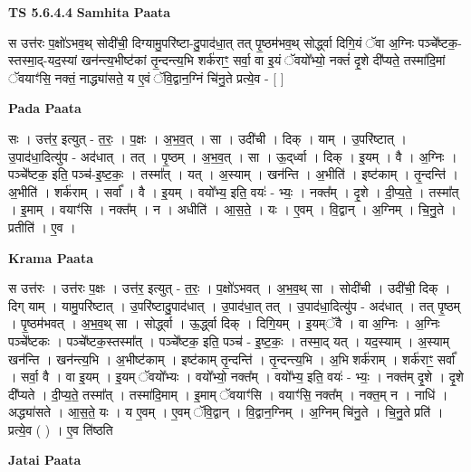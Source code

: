 \documentclass[17pt]{extarticle}
\begin{document}
\textbf{TS 5.6.4.4 } \newline
\textbf{Samhita Paata} \newline

स उत्त॑रः प॒क्षो॑ऽभव॒थ् सोदी॑ची॒ दिग्यामु॒परि॑ष्टा-दु॒पाद॑धा॒त् तत् पृ॒ष्ठम॑भव॒थ् सोर्द्ध्वा दिगि॒यं ॅवा अ॒ग्निः पञ्चे᳚ष्टक॒-स्तस्मा॒द्-यद॒स्यां खन॑न्त्य॒भीष्ट॑कां तृ॒न्दन्त्य॒भि शर्क॑राꣳ॒॒ सर्वा॒ वा इ॒यं ॅवयो᳚भ्यो॒ नक्तं॑ दृ॒शे दी᳚प्यते॒ तस्मा॑दि॒मां ॅवयाꣳ॑सि॒ नक्तं॒ नाद्ध्या॑सते॒ य ए॒वं ॅवि॒द्वान॒ग्निं चि॑नु॒ते प्रत्ये॒व - [  ] \newline

\textbf{Pada Paata} \newline

सः । उत्त॑र॒ इत्युत् - त॒रः॒ । प॒क्षः । अ॒भ॒व॒त् । सा । उदी॑ची । दिक् । याम् । उ॒परि॑ष्टात् । उ॒पाद॑धा॒दित्यु॑प - अद॑धात् । तत् । पृ॒ष्ठम् । अ॒भ॒व॒त् । सा । ऊ॒द्‌र्ध्वा । दिक् । इ॒यम् । वै । अ॒ग्निः । पञ्चे᳚ष्टक॒ इति॒ पञ्च॑-इ॒ष्ट॒कः॒ । तस्मा᳚त् । यत् । अ॒स्याम् । खन॑न्ति । अ॒भीति॑ । इष्ट॑काम् । तृ॒न्दन्ति॑ । अ॒भीति॑ । शर्क॑राम् । सर्वा᳚ । वै । इ॒यम् । वयो᳚भ्य॒ इति॒ वयः॑ - भ्यः॒ । नक्त᳚म् । दृ॒शे । दी॒प्य॒ते॒ । तस्मा᳚त् । इ॒माम् । वयाꣳ॑सि । नक्त᳚म् । न । अधीति॑ । आ॒स॒ते॒ । यः । ए॒वम् । वि॒द्वान् । अ॒ग्निम् । चि॒नु॒ते । प्रतीति॑ । ए॒व ।  \newline


\textbf{Krama Paata} \newline

स उत्त॑रः । उत्त॑रः प॒क्षः । उत्त॑र॒ इत्युत् - त॒रः॒ । प॒क्षो॑ऽभवत् । अ॒भ॒व॒थ् सा । सोदी॑ची । उदी॑ची॒ दिक् । दिग् याम् । यामु॒परि॑ष्टात् । उ॒परि॑ष्टादु॒पाद॑धात् । उ॒पाद॑धा॒त् तत् । उ॒पाद॑धा॒दित्यु॑प - अद॑धात् । तत् पृ॒ष्ठम् । पृ॒ष्ठम॑भवत् । अ॒भ॒व॒थ् सा । सोर्द्ध्वा । ऊ॒र्द्ध्वा दिक् । दिगि॒यम् । इ॒यम्ॅवै । वा अ॒ग्निः । अ॒ग्निः पञ्चे᳚ष्टकः । पञ्चे᳚ष्टक॒स्तस्मा᳚त् । पञ्चे᳚ष्टक॒ इति॒ पञ्च॑ - इ॒ष्ट॒कः॒ । तस्मा॒द् यत् । यद॒स्याम् । अ॒स्याम् खन॑न्ति । खन॑न्त्य॒भि । अ॒भीष्ट॑काम् । इष्ट॑काम् तृ॒न्दन्ति॑ । तृ॒न्दन्त्य॒भि । अ॒भि शर्क॑राम् । शर्क॑राꣳ॒॒ सर्वा᳚ । सर्वा॒ वै । वा इ॒यम् । इ॒यम् ॅवयो᳚भ्यः । वयो᳚भ्यो॒ नक्त᳚म् । वयो᳚भ्य॒ इति॒ वयः॑ - भ्यः॒ । नक्त॑म् दृ॒शे । दृ॒शे दी᳚प्यते । दी॒प्य॒ते॒ तस्मा᳚त् । तस्मा॑दि॒माम् । इ॒माम् ॅवयाꣳ॑सि । वयाꣳ॑सि॒ नक्त᳚म् । नक्त॒म् न । नाधि॑ । अद्ध्या॑सते । आ॒स॒ते॒ यः । य ए॒वम् । ए॒वम् ॅवि॒द्वान् । वि॒द्वान॒ग्निम् । अ॒ग्निम् चि॑नु॒ते । चि॒नु॒ते प्रति॑ । प्रत्ये॒व ( ) । ए॒व ति॑ष्ठति \newline

\textbf{Jatai Paata} \newline
\end{document}
